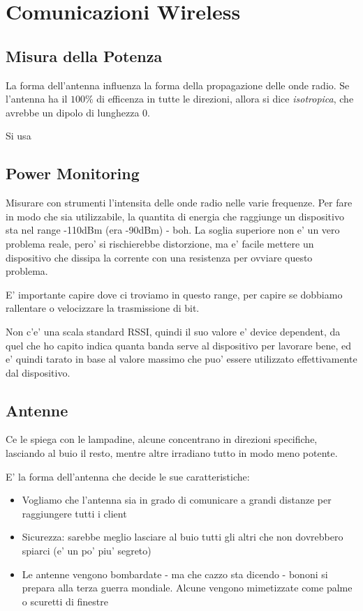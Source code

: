 % 
\chapter{Comunicazioni Wireless}

\section{Misura della Potenza}
La forma dell'antenna influenza la forma della propagazione delle onde radio. Se l'antenna ha il $ 100\% $ di efficenza in tutte le direzioni, allora si dice \textit{isotropica}, che avrebbe un dipolo di lunghezza 0.

Si usa 

\section{Power Monitoring}
Misurare con strumenti l'intensita delle onde radio nelle varie frequenze. Per fare in modo che sia utilizzabile, la quantita di energia che raggiunge un dispositivo sta nel range -110dBm (era -90dBm) - boh. La soglia superiore non e' un vero problema reale, pero' si rischierebbe distorzione, ma e' facile mettere un dispositivo che dissipa la corrente con una resistenza per ovviare questo problema.

E' importante capire dove ci troviamo in questo range, per capire se dobbiamo rallentare o velocizzare la trasmissione di bit. 

Non c'e' una scala standard RSSI, quindi il suo valore e' device dependent, da quel che ho capito indica quanta banda serve al dispositivo per lavorare bene, ed e' quindi tarato in base al valore massimo che puo' essere utilizzato effettivamente dal dispositivo.

\section{Antenne}
Ce le spiega con le lampadine, alcune concentrano in direzioni specifiche, lasciando al buio il resto, mentre altre irradiano tutto in modo meno potente.

E' la forma dell'antenna che decide le sue caratteristiche:
\begin{itemize}
\item Vogliamo che l'antenna sia in grado di comunicare a grandi distanze per raggiungere tutti i client
\item Sicurezza: sarebbe meglio lasciare al buio tutti gli altri che non dovrebbero spiarci (e' un po' piu' segreto)
\item Le antenne vengono bombardate - ma che cazzo sta dicendo - bononi si prepara alla terza guerra mondiale. Alcune vengono mimetizzate come palme o scuretti di finestre
\end{itemize}

